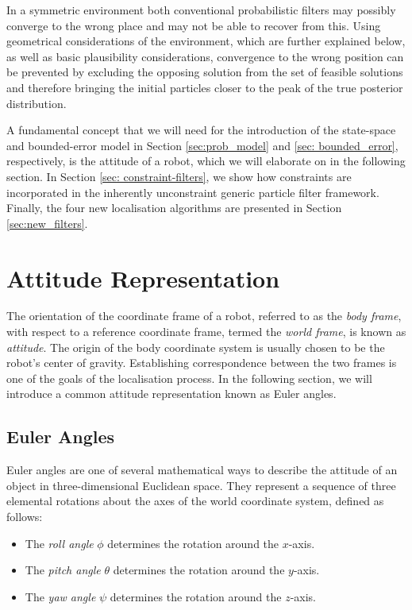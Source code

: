 In a symmetric environment both conventional probabilistic filters may possibly converge to the wrong place and may not be able to recover from this. Using geometrical considerations of the environment, which are further explained below, as well as basic plausibility considerations, convergence to the wrong position can be prevented by excluding the opposing solution from the set of feasible solutions and therefore bringing the initial particles closer to the peak of the true posterior distribution.

A fundamental concept that we will need for the introduction of the state-space and bounded-error model in Section \ref{sec:prob_model} and \ref{sec: bounded_error}, respectively, is the attitude of a robot, which we will elaborate on in the following section. In Section \ref{sec: constraint-filters}, we show how constraints are incorporated in the inherently unconstraint generic particle filter framework. Finally, the four new localisation algorithms are presented in Section \ref{sec:new_filters}.




\section{Attitude Representation}

The orientation of the coordinate frame of a robot, referred to as the \emph{body frame}, with respect to a reference coordinate frame, termed the \emph{world frame}, is known as \emph{attitude}. The origin of the body coordinate system is usually chosen to be the robot's center of gravity. Establishing correspondence between the two frames is one of the goals of the localisation process. In the following section, we will introduce a common attitude representation known as Euler angles.

\subsection{Euler Angles}

Euler angles are one of several mathematical ways to describe the attitude of an object in three-dimensional Euclidean space. They represent a sequence of three elemental rotations about the axes of the world coordinate system, defined as follows:

\begin{itemize}
\item The \emph{roll angle} $\phi$ determines the rotation around the $x$-axis.
\item The \emph{pitch angle} $\theta$ determines the rotation around the $y$-axis.
\item The \emph{yaw angle} $\psi$ determines the rotation around the $z$-axis.
\end{itemize}

